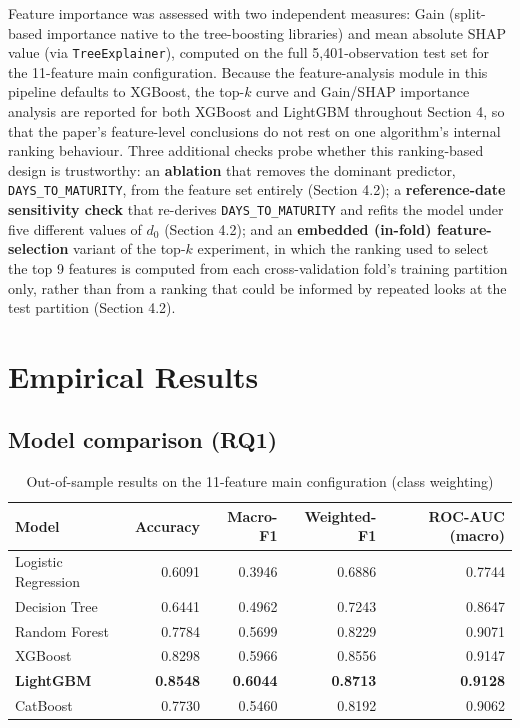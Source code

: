 \documentclass[11pt,a4paper]{article}
\begin{document}
Feature importance was assessed with two independent measures: Gain (split-based importance native to the tree-boosting libraries) and mean absolute SHAP value (via \texttt{TreeExplainer}), computed on the full 5,401-observation test set for the 11-feature main configuration. Because the feature-analysis module in this pipeline defaults to XGBoost, the top-$k$ curve and Gain/SHAP importance analysis are reported for both XGBoost and LightGBM throughout Section 4, so that the paper's feature-level conclusions do not rest on one algorithm's internal ranking behaviour. Three additional checks probe whether this ranking-based design is trustworthy: an \textbf{ablation} that removes the dominant predictor, \texttt{DAYS\_TO\_MATURITY}, from the feature set entirely (Section 4.2); a \textbf{reference-date sensitivity check} that re-derives \texttt{DAYS\_TO\_MATURITY} and refits the model under five different values of $d_0$ (Section 4.2); and an \textbf{embedded (in-fold) feature-selection} variant of the top-$k$ experiment, in which the ranking used to select the top 9 features is computed from each cross-validation fold's training partition only, rather than from a ranking that could be informed by repeated looks at the test partition (Section 4.2).

\section{Empirical Results}

\subsection{Model comparison (RQ1)}

\begin{table}[H]
\centering
\caption{Out-of-sample results on the 11-feature main configuration (class weighting)}
\begin{tabular}{lrrrr}
\toprule
Model & Accuracy & Macro-F1 & Weighted-F1 & ROC-AUC (macro) \\
\midrule
Logistic Regression & 0.6091 & 0.3946 & 0.6886 & 0.7744 \\
Decision Tree   & 0.6441 & 0.4962 & 0.7243 & 0.8647 \\
Random Forest   & 0.7784 & 0.5699 & 0.8229 & 0.9071 \\
XGBoost         & 0.8298 & 0.5966 & 0.8556 & 0.9147 \\
\textbf{LightGBM} & \textbf{0.8548} & \textbf{0.6044} & \textbf{0.8713} & \textbf{0.9128} \\
CatBoost        & 0.7730 & 0.5460 & 0.8192 & 0.9062 \\
\bottomrule
\end{tabular}
\end{table}
\end{document}
